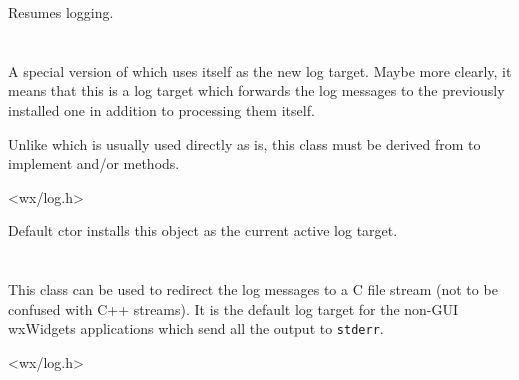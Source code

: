 \label{wxlognulldtor}

Resumes logging.


\section{}\label{wxlogpassthrough}

A special version of  which uses itself as the
new log target. Maybe more clearly, it means that this is a log target which
forwards the log messages to the previously installed one in addition to
processing them itself.

Unlike  which is usually used directly as is,
this class must be derived from to implement 
and/or  methods.




<wx/log.h>


\label{wxlogpassthroughctor}

Default ctor installs this object as the current active log target.


\section{}\label{wxlogstderr}

This class can be used to redirect the log messages to a C file stream (not to
be confused with C++ streams). It is the default log target for the non-GUI
wxWidgets applications which send all the output to {\tt stderr}.




<wx/log.h>


